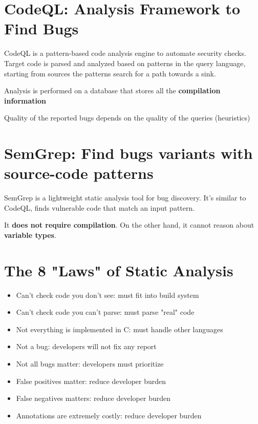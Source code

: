 \documentclass[11pt]{article}
\begin{document}
\section*{CodeQL: Analysis Framework to Find Bugs}

CodeQL is a pattern-based code analysis engine to automate security checks. Target code is parsed and analyzed based on patterns in the query language, starting from sources the patterns search for a path towards a sink. 

Analysis is performed on a database that stores all the \textbf{compilation information}

Quality of the reported bugs depends on the quality of the queries (heuristics)

\section*{SemGrep: Find bugs variants with source-code patterns}

SemGrep is a lightweight static analysis tool for bug discovery. It's similar to CodeQL, finds vulnerable code that match an input pattern. 

It \textbf{does not require compilation}. On the other hand, it cannot reason about \textbf{variable types}.

\section*{The 8 "Laws" of Static Analysis}

\begin{itemize}
	\item Can't check code you don't see: must fit into build system
	\item Can't check code you can't parse: must parse "real" code
	\item Not everything is implemented in C: must handle other languages
	\item Not a bug: developers will not fix any report
	\item Not all bugs matter: developers must prioritize
	\item False positives matter: reduce developer burden
	\item False negatives matters: reduce developer burden
	\item Annotations are extremely costly: reduce developer burden
\end{itemize}

\vspace{0.5cm}
\end{document}
